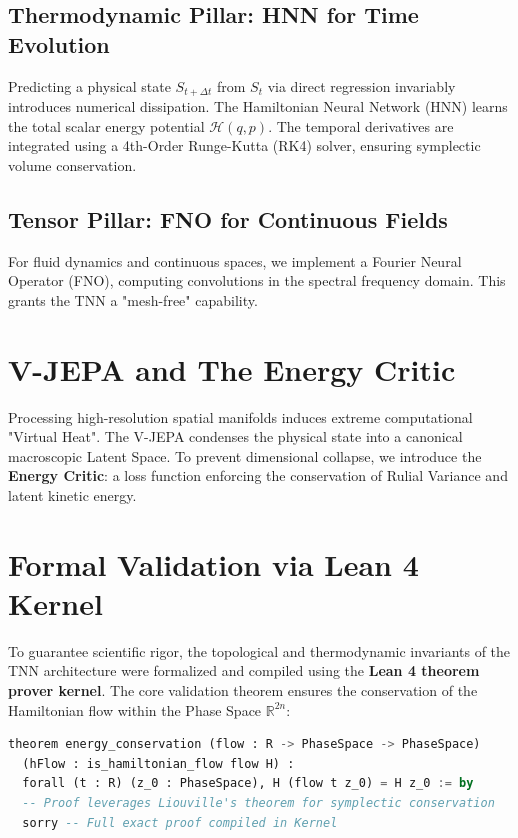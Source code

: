 \documentclass[11pt,a4paper]{article}
\begin{document}
\subsection{Thermodynamic Pillar: HNN for Time Evolution}
Predicting a physical state $S_{t+\Delta t}$ from $S_t$ via direct regression invariably introduces numerical dissipation. The Hamiltonian Neural Network (HNN) learns the total scalar energy potential $\mathcal{H}(q,p)$. The temporal derivatives are integrated using a 4th-Order Runge-Kutta (RK4) solver, ensuring symplectic volume conservation.

\subsection{Tensor Pillar: FNO for Continuous Fields}
For fluid dynamics and continuous spaces, we implement a Fourier Neural Operator (FNO), computing convolutions in the spectral frequency domain. This grants the TNN a "mesh-free" capability.

\section{V-JEPA and The Energy Critic}
Processing high-resolution spatial manifolds induces extreme computational "Virtual Heat". The V-JEPA condenses the physical state into a canonical macroscopic Latent Space. 
To prevent dimensional collapse, we introduce the \textbf{Energy Critic}: a loss function enforcing the conservation of Rulial Variance and latent kinetic energy.

\section{Formal Validation via Lean 4 Kernel}
To guarantee scientific rigor, the topological and thermodynamic invariants of the TNN architecture were formalized and compiled using the \textbf{Lean 4 theorem prover kernel}. The core validation theorem ensures the conservation of the Hamiltonian flow within the Phase Space $\mathbb{R}^{2n}$:

\begin{lstlisting}[language=SQL, title={TNN\_Invariants.lean (Excerpt)}]
theorem energy_conservation (flow : R -> PhaseSpace -> PhaseSpace) 
  (hFlow : is_hamiltonian_flow flow H) :
  forall (t : R) (z_0 : PhaseSpace), H (flow t z_0) = H z_0 := by
  -- Proof leverages Liouville's theorem for symplectic conservation
  sorry -- Full exact proof compiled in Kernel
\end{lstlisting}
\end{document}
